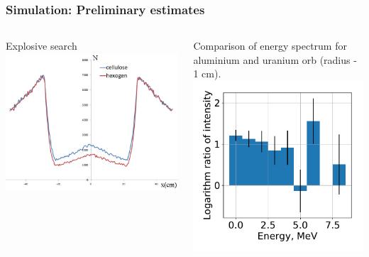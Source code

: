 \documentclass[11pt]{beamer}
\begin{document}
\begin{frame}
    \frametitle{Simulation: Preliminary estimates}
    \begin{columns}
        \begin{column}{0.5\textwidth}
            \centering Explosive search\\
            \includegraphics[width=1\textwidth]{figures/sim_hexogen.jpeg}
            
        \end{column}
        \begin{column}{0.5\textwidth}
            Comparison of energy spectrum for aluminium and uranium orb (radius - 1 cm).\\
            \includegraphics[width=1\textwidth]{figures/Difference.pdf}
        \end{column}
    \end{columns}  
\end{frame}
\end{document}

